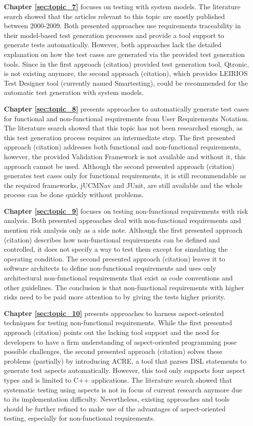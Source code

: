 \textbf{Chapter \ref{sec:topic_7}} focuses on testing with system models. The literature search showed that the articles relevant to this topic are mostly published between 2000-2009. Both presented approaches use requirements traceability in their model-based test generation processes and provide a tool support to generate tests automatically. However, both approaches lack the detailed explanation on how the test cases are generated via the provided test generation tools. Since in the first approach (citation) provided test generation tool, Qtronic, is not existing anymore, the second approach (citation), which provides LEIRIOS Test Designer tool (currently named Smartesting), could be recommended for the automatic test generation with system models.

\textbf{Chapter \ref{sec:topic_8}} presents approaches to automatically generate test cases for functional and non-functional requirements from User Requirements Notation. The literature search showed that this topic has not been researched enough, as this test generation process requires an intermediate step. The first presented approach (citation) addresses both functional and non-functional requirements, however, the provided Validation Framework is not available and without it, this approach cannot be used. Although the second presented approach (citation) generates test cases only for functional requirements, it is still recommendable as the required frameworks, jUCMNav and JUnit, are still available and the whole process can be done quickly without problems. 

\textbf{Chapter \ref{sec:topic_9}} focuses on testing non-functional requirements with risk analysis. Both presented approaches deal with non-functional requirements and mention risk analysis only as a side note. Although the first presented approach (citation) describes how non-functional requirements can be defined and controlled, it does not specify a way to test them except for simulating the operating condition. The second presented approach (citation) leaves it to software architects to define non-functional requirements and uses only architectural non-functional requirements that exist as code conventions and other guidelines. The conclusion is that non-functional requirements with higher risks need to be paid more attention to by giving the tests higher priority.

\textbf{Chapter \ref{sec:topic_10}} presents approaches to harness aspect-oriented techniques for testing non-functional requirements. While the first presented approach (citation) points out the lacking tool support and the need for developers to have a firm understanding of aspect-oriented programming pose possible challenges, the second presented approach (citation) solves these problems (partially) by introducing ACRE, a tool that parses DSL statements to generate test aspects automatically. However, this tool only supports four aspect types and is limited to C++ applications. The literature search showed that systematic testing using aspects is not in focus of current research anymore due to its implementation difficulty. Nevertheless, existing approaches and tools should be further refined to make use of the advantages of aspect-oriented testing, especially for non-functional requirements. 


